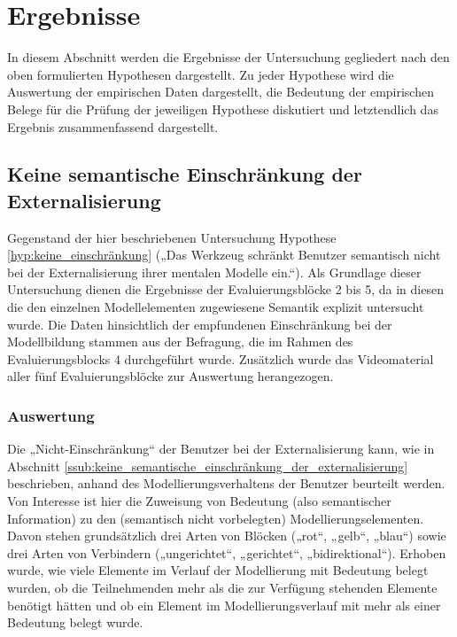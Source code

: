 
\section{Ergebnisse} %
\label{sec:m_ergebnisse}

In diesem Abschnitt werden die Ergebnisse der Untersuchung gegliedert nach den oben formulierten Hypothesen dargestellt. Zu jeder Hypothese wird die Auswertung der empirischen Daten dargestellt, die Bedeutung der empirischen Belege für die Prüfung der jeweiligen Hypothese diskutiert und letztendlich das Ergebnis zusammenfassend dargestellt.  

\subsection{Keine semantische Einschränkung der Externalisierung} %
\label{sub:keine_semantische_einschränkung_der_externalisierung}

Gegenstand der hier beschriebenen Untersuchung Hypothese \ref{hyp:keine_einschränkung} („Das Werkzeug schränkt Benutzer semantisch nicht bei der Externalisierung ihrer mentalen Modelle ein.“). Als Grundlage dieser Untersuchung dienen die Ergebnisse der Evaluierungsblöcke 2 bis 5, da in diesen die den einzelnen Modellelementen zugewiesene Semantik explizit untersucht wurde. Die Daten hinsichtlich der empfundenen Einschränkung bei der Modellbildung stammen aus der Befragung, die im Rahmen des Evaluierungsblocks 4 durchgeführt wurde. Zusätzlich wurde das Videomaterial aller fünf Evaluierungsblöcke zur Auswertung herangezogen.

\subsubsection{Auswertung} %

Die „Nicht-Einschränkung“ der Benutzer bei der Externalisierung kann, wie in Abschnitt \ref{ssub:keine_semantische_einschränkung_der_externalisierung} beschrieben, anhand des Modellierungsverhaltens der Benutzer beurteilt werden. Von Interesse ist hier die Zuweisung von Bedeutung (also semantischer Information) zu den (semantisch nicht vorbelegten) Modellierungselementen. Davon stehen grundsätzlich drei Arten von Blöcken („rot“, „gelb“, „blau“) sowie drei Arten von Verbindern („ungerichtet“, „gerichtet“, „bidirektional“). Erhoben wurde, wie viele Elemente im Verlauf der Modellierung mit Bedeutung belegt wurden, ob die Teilnehmenden mehr als die zur Verfügung stehenden Elemente benötigt hätten und ob ein Element im Modellierungsverlauf mit mehr als einer Bedeutung belegt wurde. 

